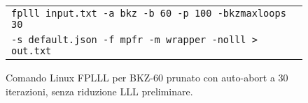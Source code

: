 \begin{figure}[h]
    \centering
    \begin{tabular}{l}
        \texttt{fplll input.txt -a bkz -b 60 -p 100 -bkzmaxloops 30} \\
        \texttt{-s default.json -f mpfr -m wrapper -nolll > out.txt} \\
    \end{tabular}
    \caption{Comando Linux FPLLL per BKZ-60 prunato con auto-abort a 30 iterazioni, 
    senza riduzione LLL preliminare.}
    \label{fig:bkzcommand2}
\end{figure}